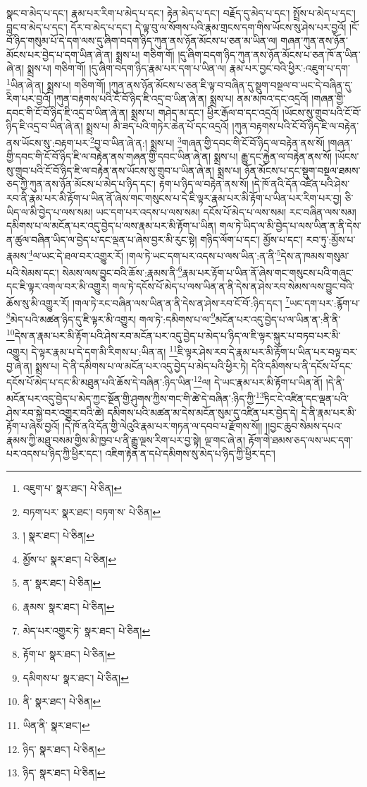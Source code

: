 སྣང་བ་མེད་པ་དང་། རྣམ་པར་རིག་པ་མེད་པ་དང་། རྟེན་མེད་པ་དང་། བརྗོད་དུ་མེད་པ་དང་། སྤྲོས་པ་མེད་པ་དང་། བླང་བ་མེད་པ་དང་། དོར་བ་མེད་པ་དང་། དེ་ལྟ་བུ་ལ་སོགས་པའི་རྣམ་གྲངས་དག་གིས་ཡོངས་སུ་ཤེས་པར་བྱའོ། །ངོ་བོ་ཉིད་གསུམ་པོ་དེ་དག་ལས་དུ་ཞིག་བདག་ཉིད་ཀུན་ནས་ཉོན་མོངས་པ་ཅན་མ་ཡིན་ལ། གཞན་ཀུན་ནས་ཉོན་མོངས་པར་བྱེད་པ་དག་ཡིན་ཞེ་ན། སྨྲས་པ། གཅིག་གོ། །དུ་ཞིག་བདག་ཉིད་ཀུན་ནས་ཉོན་མོངས་པ་ཅན་ཁོ་ན་ཡིན་ཞེ་ན། སྨྲས་པ། གཅིག་གོ། །དུ་ཞིག་བདག་ཉིད་རྣམ་པར་དག་པ་ཡིན་ལ། རྣམ་པར་བྱང་བའི་ཕྱིར་:འཇུག་པ་དག་\footnote{འཇུག་པ་  སྣར་ཐང་།  པེ་ཅིན། }ཡིན་ཞེ་ན། སྨྲས་པ། གཅིག་གོ། །ཀུན་ནས་ཉོན་མོངས་པ་ཅན་ཇི་ལྟ་བ་བཞིན་དུ་སྡུག་བསྔལ་བ་ཡང་དེ་བཞིན་དུ་རིག་པར་བྱའོ། །ཀུན་བརྟགས་པའི་ངོ་བོ་ཉིད་ཇི་འདྲ་བ་ཡིན་ཞེ་ན། སྨྲས་པ། ནམ་མཁའ་དང་འདྲའོ། །གཞན་གྱི་དབང་གི་ངོ་བོ་ཉིད་ཇི་འདྲ་བ་ཡིན་ཞེ་ན། སྨྲས་པ། གཤེད་མ་དང་། ཕྱིར་རྒོལ་བ་དང་འདྲའོ། །ཡོངས་སུ་གྲུབ་པའི་ངོ་བོ་ཉིད་ཇི་འདྲ་བ་ཡིན་ཞེ་ན། སྨྲས་པ། མི་ཟད་པའི་གཏེར་ཆེན་པོ་དང་འདྲའོ། །ཀུན་བརྟགས་པའི་ངོ་བོ་ཉིད་ཇི་ལ་བརྟེན་ནས་ཡོངས་སུ་:བརྟག་པར་\footnote{བཏག་པར་  སྣར་ཐང་། བཏག་ས་  པེ་ཅིན། }བྱ་བ་ཡིན་ཞེ་ན:། སྨྲས་པ། \footnote{།    སྣར་ཐང་།  པེ་ཅིན། }གཞན་གྱི་དབང་གི་ངོ་བོ་ཉིད་ལ་བརྟེན་ནས་སོ། །གཞན་གྱི་དབང་གི་ངོ་བོ་ཉིད་ཇི་ལ་བརྟེན་ནས་གཞན་གྱི་དབང་ཡིན་ཞེ་ན། སྨྲས་པ། རྒྱུ་དང་རྐྱེན་ལ་བརྟེན་ནས་སོ། །ཡོངས་སུ་གྲུབ་པའི་ངོ་བོ་ཉིད་ཇི་ལ་བརྟེན་ནས་ཡོངས་སུ་གྲུབ་པ་ཡིན་ཞེ་ན། སྨྲས་པ། ཉོན་མོངས་པ་དང་སྡུག་བསྔལ་ཐམས་ཅད་ཀྱི་ཀུན་ནས་ཉོན་མོངས་པ་མེད་པ་ཉིད་དང་། རྟག་པ་ཉིད་ལ་བརྟེན་ནས་སོ། །དེ་ཁོ་ནའི་དོན་འཛིན་པའི་ཤེས་རབ་ནི་རྣམ་པར་མི་རྟོག་པ་ཡིན་ནོ་ཞེས་གང་གསུངས་པ་དེ་ཇི་ལྟར་རྣམ་པར་མི་རྟོག་པ་ཡིན་པར་རིག་པར་བྱ། ཅི་ཡིད་ལ་མི་བྱེད་པ་ལས་སམ། ཡང་དག་པར་འདས་པ་ལས་སམ། དངོས་པོ་མེད་པ་ལས་སམ། རང་བཞིན་ལས་སམ། དམིགས་པ་ལ་མངོན་པར་འདུ་བྱེད་པ་ལས་རྣམ་པར་མི་རྟོག་པ་ཡིན། གལ་ཏེ་ཡིད་ལ་མི་བྱེད་པ་ལས་ཡིན་ན་ནི་དེས་ན་ཚུལ་བཞིན་ཡིད་ལ་བྱེད་པ་དང་ལྡན་པ་ཞེས་བྱར་མི་རུང་སྟེ། གཉིད་ལོག་པ་དང་། མྱོས་པ་དང་། རབ་ཏུ་:མྱོས་པ་རྣམས་\footnote{མྱོས་པ་  སྣར་ཐང་།  པེ་ཅིན། }ལ་ཡང་དེ་ཐལ་བར་འགྱུར་རོ། །གལ་ཏེ་ཡང་དག་པར་འདས་པ་ལས་ཡིན་:ན་ནི་\footnote{ན་  སྣར་ཐང་།  པེ་ཅིན། }དེས་ན་ཁམས་གསུམ་པའི་སེམས་དང་། སེམས་ལས་བྱུང་བའི་ཆོས་:རྣམས་ནི་\footnote{རྣམས་  སྣར་ཐང་།  པེ་ཅིན། }རྣམ་པར་རྟོག་པ་ཡིན་ནོ་ཞེས་གང་གསུངས་པའི་གཞུང་དང་ཇི་ལྟར་འགལ་བར་མི་འགྱུར། གལ་ཏེ་དངོས་པོ་མེད་པ་ལས་ཡིན་ན་ནི་དེས་ན་ཤེས་རབ་སེམས་ལས་བྱུང་བའི་ཆོས་སུ་མི་འགྱུར་རོ། །གལ་ཏེ་རང་བཞིན་ལས་ཡིན་ན་ནི་དེས་ན་ཤེས་རབ་ངོ་བོ་:ཉིད་དང་། \footnote{མེད་པར་འགྱུར་ཏེ་  སྣར་ཐང་།  པེ་ཅིན། }ཡང་དག་པར་:རྙོག་པ་\footnote{རྟོག་པ་  སྣར་ཐང་།  པེ་ཅིན། }མེད་པའི་མཚན་ཉིད་དུ་ཇི་ལྟར་མི་འགྱུར། གལ་ཏེ་:དམིགས་པ་ལ་\footnote{དམིགས་པ་  སྣར་ཐང་།  པེ་ཅིན། }མངོན་པར་འདུ་བྱེད་པ་ལ་ཡིན་ན་:ནི་ནི་\footnote{ནི་  སྣར་ཐང་།  པེ་ཅིན། }དེས་ན་རྣམ་པར་མི་རྟོག་པའི་ཤེས་རབ་མངོན་པར་འདུ་བྱེད་པ་མེད་པ་ཉིད་ལ་ཇི་ལྟར་སྐུར་པ་བཏབ་པར་མི་འགྱུར། དེ་ལྟར་རྣམ་པ་དེ་དག་མི་རིགས་པ་:ཡིན་ན། \footnote{ཡིན་ནི་  སྣར་ཐང་། }ཇི་ལྟར་ཤེས་རབ་དེ་རྣམ་པར་མི་རྟོག་པ་ཡིན་པར་བལྟ་བར་བྱ་ཞེ་ན། སྨྲས་པ། དེ་ནི་དམིགས་པ་ལ་མངོན་པར་འདུ་བྱེད་པ་མེད་པའི་ཕྱིར་ཏེ། དེའི་དམིགས་པ་ནི་དངོས་པོ་དང་དངོས་པོ་མེད་པ་དང་མི་མཐུན་པའི་ཆོས་དེ་བཞིན་:ཉིད་ཡིན་\footnote{ཉིད་  སྣར་ཐང་།  པེ་ཅིན། }ལ། དེ་ཡང་རྣམ་པར་མི་རྟོག་པ་ཡིན་ནོ། །དེ་ནི་མངོན་པར་འདུ་བྱེད་པ་མེད་ཀྱང་སྔོན་གྱི་ཤུགས་ཀྱིས་གང་གི་ཚེ་དེ་བཞིན་:ཉིད་ཀྱི་\footnote{ཉིད་  སྣར་ཐང་།  པེ་ཅིན། }ཏིང་ངེ་འཛིན་དང་ལྡན་པའི་ཤེས་རབ་སྐྱེ་བར་འགྱུར་བའི་ཚེ། དམིགས་པའི་མཚན་མ་དེས་མངོན་སུམ་དུ་འཛིན་པར་བྱེད་དེ། དེ་ནི་རྣམ་པར་མི་རྟོག་པ་ཞེས་བྱའོ། །དེ་ཁོ་ནའི་དོན་གྱི་ལེའུའི་རྣམ་པར་གཏན་ལ་དབབ་པ་རྫོགས་སོ།། །།བྱང་ཆུབ་སེམས་དཔའ་རྣམས་ཀྱི་མཐུ་བསམ་གྱིས་མི་ཁྱབ་པ་ནི་རྒྱུ་ལྔས་རིག་པར་བྱ་སྟེ། ལྔ་གང་ཞེ་ན། རྟོག་གེ་ཐམས་ཅད་ལས་ཡང་དག་པར་འདས་པ་ཉིད་ཀྱི་ཕྱིར་དང་། འཇིག་རྟེན་ན་དཔེ་དམིགས་སུ་མེད་པ་ཉིད་ཀྱི་ཕྱིར་དང་། 
